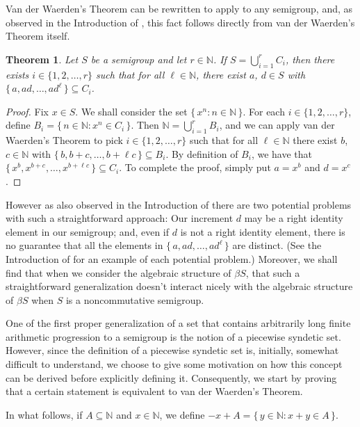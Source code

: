 \documentclass[12pt]{article}
\theoremstyle{plain}
\newtheorem{thm}{Theorem}[section]
\theoremstyle{definition}
\newcommand{\bbN}{\mathbb{N}}
\begin{document}
Van der Waerden's Theorem can be rewritten to apply to any semigroup,
and, as observed in the Introduction of \cite{Bergelson:1992fk}, this
fact follows directly from van der Waerden's Theorem itself.

\begin{thm}
  Let $S$ be a semigroup and let $r \in \bbN$.
  If $S = \bigcup_{i=1}^r C_i$, then there exists $i \in \{1, 2,
  \ldots, r\}$ such that for all $\ell \in \bbN$, there exist $a$, $d
  \in S$ with $\{\, a , ad, \ldots, ad^\ell \,\} \subseteq C_i$. 
\end{thm}
\begin{proof}
  Fix $x \in S$.
  We shall consider the set $\{\, x^n : n \in \bbN \,\}$.
  For each $i \in \{1, 2, \ldots, r\}$, define $B_i = \{\, n \in \bbN
  : x^n \in C_i \,\}$.
  Then $\bbN = \bigcup_{i=1}^r B_i$, and we can apply van der
  Waerden's Theorem to pick $i \in \{1, 2, \ldots, r\}$ such that for
  all $\ell \in \bbN$ there exist $b$, $c \in \bbN$ with $\{\, b, b+c,
  \ldots, b+\ell c \,\} \subseteq B_i$. 
  By definition of $B_i$, we have that $\{\, x^b, x^{b+c}, \ldots,
  x^{b+ \ell c} \,\} \subseteq C_i$. 
  To complete the proof, simply put $a = x^b$ and $d = x^c$. 
\end{proof}

However as also observed in the Introduction of
\cite{Bergelson:1992fk} there are two potential problems with such a
straightforward approach:
Our increment $d$ may be a right identity element in our semigroup;
and, even if $d$ is not a right identity element, there is no
guarantee that all the elements in $\{\, a, ad, \ldots, ad^{\ell}
\,\}$ are distinct. 
(See the Introduction of \cite{Bergelson:1992fk} for an example of
each potential problem.)
Moreover, we shall find that when we consider the algebraic structure
of $\beta S$, that such a straightforward generalization doesn't
interact nicely with the algebraic structure of $\beta S$ when $S$ is
a noncommutative semigroup. 

One of the first proper generalization of a set that contains
arbitrarily long finite arithmetic progression to a semigroup is the
notion of a piecewise syndetic set. 
However, since the definition of a piecewise syndetic set is, initially,
somewhat difficult to understand, we choose to give some 
motivation on how this concept can be derived before explicitly
defining it. 
Consequently, we start by proving that a certain statement is
equivalent to van der Waerden's Theorem. 

In what follows, if $A \subseteq \bbN$ and $x \in \bbN$, we define $-x
+ A = \{\, y \in \bbN : x + y \in A \,\}$.
\end{document}
